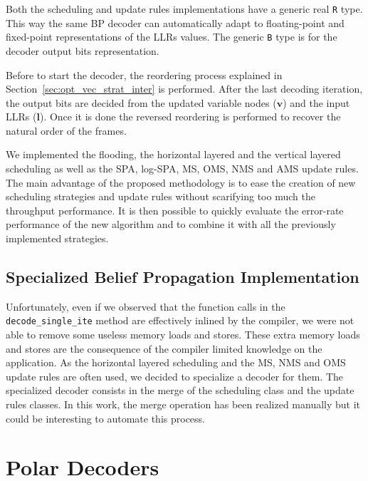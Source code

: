 Both the scheduling and update rules implementations have a generic real
\verb|R| type. This way the same BP decoder can automatically adapt to
floating-point and fixed-point representations of the LLRs values. The generic
\verb|B| type is for the decoder output bits representation.

Before to start the decoder, the reordering process explained in
Section~\ref{sec:opt_vec_strat_inter} is performed. After the last decoding
iteration, the output bits are decided from the updated variable nodes
($\bm{v}$) and the input LLRs ($\bm{l}$). Once it is done the reversed
reordering is performed to recover the natural order of the frames.

We implemented the flooding, the horizontal layered and the vertical layered
scheduling as well as the SPA, log-SPA, MS, OMS, NMS and AMS update rules.
The main advantage of the proposed methodology is to ease the creation of new
scheduling strategies and update rules without scarifying too much the
throughput performance. It is then possible to quickly evaluate the error-rate
performance of the new algorithm and to combine it with all the previously
implemented strategies.

\subsection{Specialized Belief Propagation Implementation}

Unfortunately, even if we observed that the function calls in the
\verb|decode_single_ite| method are effectively inlined by the compiler, we were
not able to remove some useless memory loads and stores. These extra memory
loads and stores are the consequence of the compiler limited knowledge on the
application. As the horizontal layered scheduling and the MS, NMS and OMS update
rules are often used, we decided to specialize a decoder for them. The
specialized decoder consists in the merge of the scheduling class and the update
rules classes. In this work, the merge operation has been realized manually but
it could be interesting to automate this process.

\section{Polar Decoders}
\label{sec:vec_polar}

